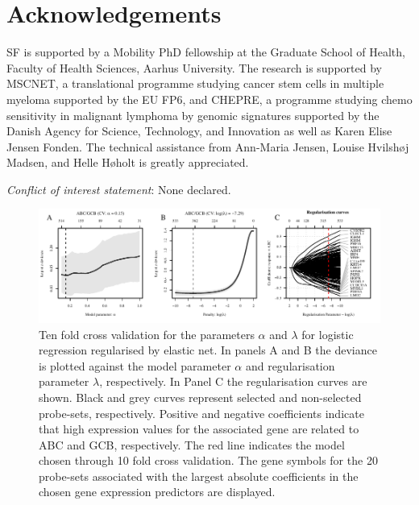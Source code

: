 \documentclass{article}
\begin{document}
{}
\section*{Acknowledgements}
SF is supported by a Mobility PhD fellowship at the Graduate School of Health, Faculty of Health Sciences, Aarhus University.
The research is supported by MSCNET, a translational programme studying cancer stem cells in multiple myeloma supported by the EU FP6, and CHEPRE, a programme studying chemo sensitivity in malignant lymphoma by genomic signatures supported by the Danish Agency for Science, Technology, and Innovation as well as Karen Elise Jensen Fonden.
The technical assistance from Ann-Maria Jensen, Louise Hvilsh{\o}j Madsen, and Helle H{\o}holt is greatly appreciated.



\noindent\textit{Conflict of interest statement}: None declared.
{}




\begin{figure}[htb]
\begin{center}
\includegraphics[width=1\textwidth]{CrosvalidationClass.pdf}
\end{center}
\caption{Ten fold cross validation for the parameters $\alpha$ and $\lambda$ for logistic regression regularised by elastic net.
In panels A and B the deviance is plotted against the model parameter $\alpha$ and regularisation parameter $\lambda$, respectively.
In Panel C the regularisation curves are shown.
Black and grey curves represent selected and non-selected probe-sets, respectively.
Positive and negative coefficients indicate that high expression values for the associated gene are related to ABC and GCB, respectively.
The red line indicates the model chosen through 10 fold cross validation.
The gene symbols for the 20 probe-sets associated with the largest absolute coefficients in the chosen gene expression predictors are displayed.}
\label{fig:crossval}
\end{figure}
\end{document}
